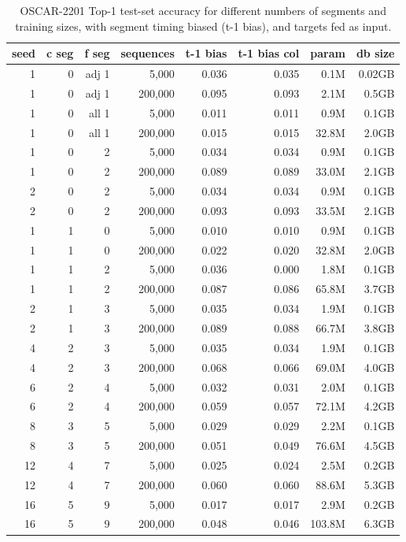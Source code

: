 \begin{table}[H]
\centering
\caption{OSCAR-2201 Top-1 test-set accuracy for different numbers of segments and training sizes, with segment timing biased (t-1 bias), and targets fed as input.}
\label{tab:oscar-test-top1-accuracy-spacyPipelineOptimisations}
\begin{tabular}{rrrrrrrr}
\toprule
\textbf{seed} & \textbf{c seg} & \textbf{f seg} & \textbf{sequences} & \textbf{t-1 bias} & \textbf{t-1 bias col} & \textbf{param} & \textbf{db size} \\
\midrule
1 & 0 & adj 1 & 5,000   & 0.036 & 0.035 & 0.1M & 0.02GB \\
1 & 0 & adj 1 & 200,000 & 0.095 & 0.093 & 2.1M & 0.5GB \\
1 & 0 & all 1 & 5,000   & 0.011 & 0.011 & 0.9M & 0.1GB \\
1 & 0 & all 1 & 200,000 & 0.015 & 0.015 & 32.8M & 2.0GB \\
1 & 0 & 2 & 5,000   & 0.034 & 0.034 & 0.9M & 0.1GB \\
1 & 0 & 2 & 200,000 & 0.089 & 0.089 & 33.0M & 2.1GB \\
2 & 0 & 2 & 5,000   & 0.034 & 0.034 & 0.9M & 0.1GB \\
2 & 0 & 2 & 200,000 & 0.093 & 0.093 & 33.5M & 2.1GB \\
1 & 1 & 0 & 5,000   & 0.010 & 0.010 & 0.9M & 0.1GB \\
1 & 1 & 0 & 200,000 & 0.022 & 0.020 & 32.8M & 2.0GB \\
1 & 1 & 2 & 5,000   & 0.036 & 0.000 & 1.8M & 0.1GB \\
1 & 1 & 2 & 200,000 & 0.087 & 0.086 & 65.8M & 3.7GB \\
2 & 1 & 3 & 5,000   & 0.035 & 0.034 & 1.9M & 0.1GB \\
2 & 1 & 3 & 200,000 & 0.089 & 0.088 & 66.7M & 3.8GB \\
4 & 2 & 3 & 5,000   & 0.035 & 0.034 & 1.9M & 0.1GB \\
4 & 2 & 3 & 200,000 & 0.068 & 0.066 & 69.0M & 4.0GB \\
6 & 2 & 4 & 5,000   & 0.032 & 0.031 & 2.0M & 0.1GB \\
6 & 2 & 4 & 200,000 & 0.059 & 0.057 & 72.1M & 4.2GB \\
8 & 3 & 5 & 5,000   & 0.029 & 0.029 & 2.2M & 0.1GB \\
8 & 3 & 5 & 200,000 & 0.051 & 0.049 & 76.6M & 4.5GB \\
12 & 4 & 7 & 5,000   & 0.025 & 0.024 & 2.5M & 0.2GB \\
12 & 4 & 7 & 200,000 & 0.060 & 0.060 & 88.6M & 5.3GB \\
16 & 5 & 9 & 5,000   & 0.017 & 0.017 & 2.9M & 0.2GB \\
16 & 5 & 9 & 200,000 & 0.048 & 0.046 & 103.8M & 6.3GB \\
\bottomrule
\end{tabular}
\end{table}

